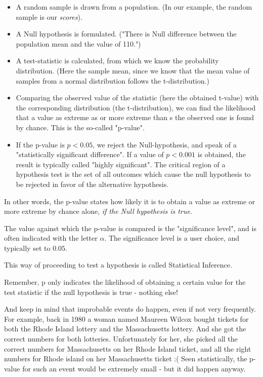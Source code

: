 \begin{itemize}
  \item A random sample is drawn from a population. (In our example, the random sample is our \emph{scores}).
  \item A Null hypothesis is formulated. ("There is Null difference between the population mean and the value of 110.")
  \item A test-statistic is calculated, from which we know the probability distribution. (Here the sample mean, since we know that the mean value of samples from a normal distribution follows the t-distribution.)
  \item Comparing the observed value of the statistic (here the obtained t-value) with the corresponding distribution (the t-distribution), we can find the likelihood that a value as extreme as or more extreme than s the observed one is found by chance. This is the so-called "p-value".
  \item If the p-value is $p<0.05$, we reject the Null-hypothesis, and speak of a "statistically significant difference". If a value of $p<0.001$ is obtained, the result is typically called "highly significant". The critical region of a hypothesis test is the set of all outcomes which cause the null hypothesis to be rejected in favor of the alternative hypothesis.
\end{itemize}

In other words, the p-value states how likely it is to obtain a value as extreme or more extreme by chance alone, \emph{if the Null hypothesis is true}.

The value against which the p-value is compared is the "significance level", and is often indicated with the letter $\alpha$. The significance level is a user choice, and typically set to $0.05$.

This way of proceeding to test a hypothesis is called Statistical Inference.

Remember, p only indicates the likelihood of obtaining a certain value for the test statistic if the null hypothesis is true - nothing else!

And keep in mind that improbable events do happen, even if not very frequently. For example, back in 1980 a woman named Maureen Wilcox bought tickets for both the Rhode Island lottery and the Massachusetts lottery. And she got the correct numbers for both lotteries. Unfortunately for her, she picked all the correct numbers for Massachusetts on her Rhode Island ticket, and all the  right numbers for Rhode island on her Massachusetts ticket :(  Seen statistically, the p-value for such an event would be extremely small - but it did happen anyway.

